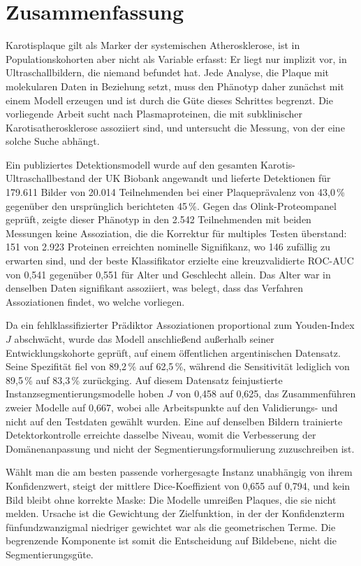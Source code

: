 \chapter*{Zusammenfassung}

Karotisplaque gilt als Marker der systemischen Atherosklerose, ist in Populationskohorten aber
nicht als Variable erfasst: Er liegt nur implizit vor, in Ultraschallbildern, die niemand
befundet hat. Jede Analyse, die Plaque mit molekularen Daten in Beziehung setzt, muss den
Phänotyp daher zunächst mit einem Modell erzeugen und ist durch die Güte dieses Schrittes
begrenzt. Die vorliegende Arbeit sucht nach Plasmaproteinen, die mit subklinischer
Karotisatherosklerose assoziiert sind, und untersucht die Messung, von der eine solche Suche
abhängt.

Ein publiziertes Detektionsmodell wurde auf den gesamten Karotis-Ultraschallbestand der UK
Biobank angewandt und lieferte Detektionen für 179{.}611 Bilder von 20{.}014 Teilnehmenden bei
einer Plaqueprävalenz von 43,0\,\% gegenüber den ursprünglich berichteten 45\,\%. Gegen das
Olink-Proteompanel geprüft, zeigte dieser Phänotyp in den 2{.}542 Teilnehmenden mit beiden
Messungen keine Assoziation, die die Korrektur für multiples Testen überstand: 151 von 2{.}923
Proteinen erreichten nominelle Signifikanz, wo 146 zufällig zu erwarten sind, und der beste
Klassifikator erzielte eine kreuzvalidierte ROC-AUC von 0,541 gegenüber 0,551 für Alter und
Geschlecht allein. Das Alter war in denselben Daten signifikant assoziiert, was belegt, dass das
Verfahren Assoziationen findet, wo welche vorliegen.

Da ein fehlklassifizierter Prädiktor Assoziationen proportional zum Youden-Index $J$ abschwächt,
wurde das Modell anschließend außerhalb seiner Entwicklungskohorte geprüft, auf einem
öffentlichen argentinischen Datensatz. Seine Spezifität fiel von 89,2\,\% auf 62,5\,\%, während
die Sensitivität lediglich von 89,5\,\% auf 83,3\,\% zurückging. Auf diesem Datensatz
feinjustierte Instanzsegmentierungsmodelle hoben $J$ von 0,458 auf 0,625, das Zusammenführen
zweier Modelle auf 0,667, wobei alle Arbeitspunkte auf den Validierungs- und nicht auf den
Testdaten gewählt wurden. Eine auf denselben Bildern trainierte Detektorkontrolle erreichte
dasselbe Niveau, womit die Verbesserung der Domänenanpassung und nicht der
Segmentierungsformulierung zuzuschreiben ist.

Wählt man die am besten passende vorhergesagte Instanz unabhängig von ihrem Konfidenzwert, steigt
der mittlere Dice-Koeffizient von 0,655 auf 0,794, und kein Bild bleibt ohne korrekte Maske: Die
Modelle umreißen Plaques, die sie nicht melden. Ursache ist die Gewichtung der Zielfunktion, in
der der Konfidenzterm fünfundzwanzigmal niedriger gewichtet war als die geometrischen Terme. Die
begrenzende Komponente ist somit die Entscheidung auf Bildebene, nicht die Segmentierungsgüte.
